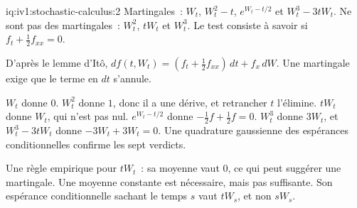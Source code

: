 \begin{solution}{iq:iv1:stochastic-calculus:2}
Martingales~: $W_t$, $W_t^2 - t$, $e^{W_t - t/2}$ et $W_t^3 - 3tW_t$. Ne sont pas des martingales~: $W_t^2$, $tW_t$ et $W_t^3$. Le test consiste à savoir si $f_t + \frac12f_{xx} = 0$.

D'après le lemme d'Itô, $df(t, W_t) = (f_t + \frac12f_{xx})\,dt + f_x\,dW$. Une martingale exige que le terme en $dt$ s'annule.

$W_t$ donne $0$. $W_t^2$ donne $1$, donc il a une dérive, et retrancher $t$ l'élimine. $tW_t$ donne $W_t$, qui n'est pas nul. $e^{W_t - t/2}$ donne $-\frac12 f + \frac12f = 0$. $W_t^3$ donne $3W_t$, et $W_t^3 - 3tW_t$ donne $-3W_t + 3W_t = 0$. Une quadrature gaussienne des espérances conditionnelles confirme les sept verdicts.

Une règle empirique pour $tW_t$~: sa moyenne vaut 0, ce qui peut suggérer une martingale. Une moyenne constante est nécessaire, mais pas suffisante. Son espérance conditionnelle sachant le temps $s$ vaut $tW_s$, et non $sW_s$.



\end{solution}

